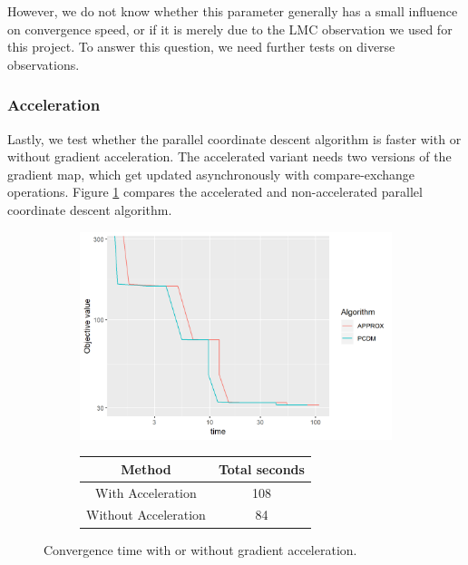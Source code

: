 However, we do not know whether this parameter generally has a small influence on convergence speed, or if it is merely due to the LMC observation we used for this project. To answer this question, we need further tests on diverse observations.


\subsubsection{Acceleration}
Lastly, we test whether the parallel coordinate descent algorithm is faster with or without gradient acceleration. The accelerated variant needs two versions of the gradient map, which get updated asynchronously with compare-exchange operations. Figure \ref{pcdm:results:acc} compares the accelerated and non-accelerated parallel coordinate descent algorithm.

\begin{figure}[h]
	\centering
	\begin{subfigure}{0.6\linewidth}
		\includegraphics[width=1.0\linewidth]{./chapters/05.pcdm/parameters/acceleration.png}
	\end{subfigure}
	\begin{subfigure}{0.35\linewidth}
		\begin{tabular}{c | c}
			Method & Total seconds \\ \hline
			With Acceleration & 108 \\
			Without Acceleration & 84 \\
		\end{tabular}
	\end{subfigure}
	\caption{Convergence time with or without gradient acceleration.}
	\label{pcdm:results:acc}
\end{figure}

